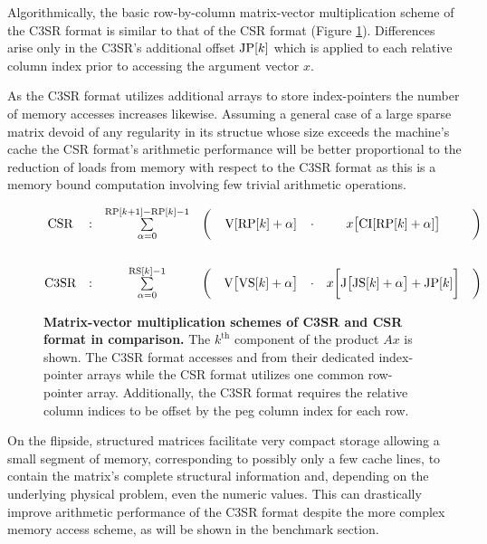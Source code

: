\documentclass{article}
\begin{document}
      Algorithmically, the basic row-by-column matrix-vector multiplication scheme of the C3SR format is similar to that of the CSR format (Figure \ref{fig:c3sr_matvecmult_basic}). Differences arise only in the C3SR's additional offset $\JP[k]$ which is applied to each relative column index prior to accessing the argument vector $x$.

      As the C3SR format utilizes additional arrays to store index-pointers the number of memory accesses increases likewise. Assuming a general case of a large sparse matrix devoid of any regularity in its structue whose size exceeds the machine's cache the CSR format's arithmetic performance will be better proportional to the reduction of loads from memory with respect to the C3SR format as this is a memory bound computation involving few trivial arithmetic operations.

      \begin{figure}[ht]
        \centering
        $$
        \begin{matrix}
          \text{CSR}  & : & \sum \limits_{\alpha = 0}^{\RP[k+1] - \RP[k] - 1} & \bigg( & \V[\RP[k] + \alpha]   & \cdot & x\big[\CI[\RP[k] + \alpha]\big] & \bigg)\\
          \vspace{0.3cm} \\
          \text{C3SR} & : & \sum \limits_{\alpha = 0}^{\RS[k] - 1} & \bigg( & \V\big[\VS[k] + \alpha\big] & \cdot & x\bigg[\J\big[\JS[k] + \alpha\big] + \JP[k]\bigg] & \bigg) \\
        \end{matrix}
        $$
        \caption[Matrix-vector multiplication schemes of C3SR and CSR format in comparison.]{\textbf{Matrix-vector multiplication schemes of C3SR and CSR format in comparison.} The $k^{\text{th}}$ component of the product $Ax$ is shown. The C3SR format accesses \V and \J from their dedicated index-pointer arrays while the CSR format utilizes one common row-pointer array. Additionally, the C3SR format requires the relative column indices to be offset by the peg column index for each row.}
        \label{fig:c3sr_matvecmult_basic}
      \end{figure}

      On the flipside, structured matrices facilitate very compact storage allowing a small segment of memory, corresponding to possibly only a few cache lines, to contain the matrix's complete structural information and, depending on the underlying physical problem, even the numeric values. This can drastically improve arithmetic performance of the C3SR format despite the more complex memory access scheme, as will be shown in the benchmark section.
\end{document}
